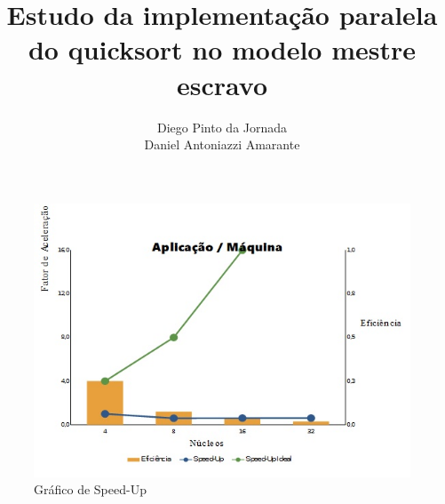 \documentclass{acm_proc_article-sp}
\begin{document}
\makeatletter
\def\@copyrightspace{\relax}
\makeatother

\title{Estudo da implementação paralela do quicksort no modelo mestre escravo}

\author{\alignauthor Diego Pinto da Jornada\\
        \alignauthor Daniel Antoniazzi Amarante\\
}

\maketitle







\begin{figure}[h]
\includegraphics[scale=0.65]{speedup.jpg}
\caption{Gráfico de Speed-Up}
\end{figure}


\end{document}
